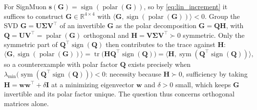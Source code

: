 For SignMuon $\mathbf{s}(\mathbf{G})=\operatorname{sign}(\operatorname{polar}(\mathbf{G}))$, so by \eqref{eq:lin_increment} it suffices to construct $\mathbf{G}\in\mathbb{R}^{4\times4}$ with $\langle \mathbf{G}, \operatorname{sign}(\operatorname{polar}(\mathbf{G})) \rangle < 0$. Group the SVD $\mathbf{G}=\mathbf{U}\boldsymbol{\Sigma}\mathbf{V}^\top$ of an invertible $\mathbf{G}$ as the polar decomposition $\mathbf{G}=\mathbf{Q}\mathbf{H}$, with $\mathbf{Q}=\mathbf{U}\mathbf{V}^\top=\operatorname{polar}(\mathbf{G})$ orthogonal and $\mathbf{H}=\mathbf{V}\boldsymbol{\Sigma}\mathbf{V}^\top\succ0$ symmetric. Only the symmetric part of $\mathbf{Q}^\top\operatorname{sign}(\mathbf{Q})$ then contributes to the trace against $\mathbf{H}$:
\begin{equation}\label{eq:qsignq}
\langle\mathbf{G},\operatorname{sign}(\operatorname{polar}(\mathbf{G}))\rangle=\operatorname{tr}\bigl(\mathbf{H}\mathbf{Q}^\top\operatorname{sign}(\mathbf{Q})\bigr)=\bigl\langle\mathbf{H},\operatorname{sym}(\mathbf{Q}^\top\operatorname{sign}(\mathbf{Q}))\bigr\rangle,
\end{equation}
so a counterexample with polar factor $\mathbf{Q}$ exists precisely when $\lambda_{\min}\bigl(\operatorname{sym}(\mathbf{Q}^\top\operatorname{sign}(\mathbf{Q}))\bigr)<0$: necessity because $\mathbf{H}\succ0$, sufficiency by taking $\mathbf{H}=\mathbf{w}\mathbf{w}^\top+\delta\mathbf{I}$ at a minimizing eigenvector $\mathbf{w}$ and $\delta>0$ small, which keeps $\mathbf{G}$ invertible and its polar factor unique. The question thus concerns orthogonal matrices alone.

